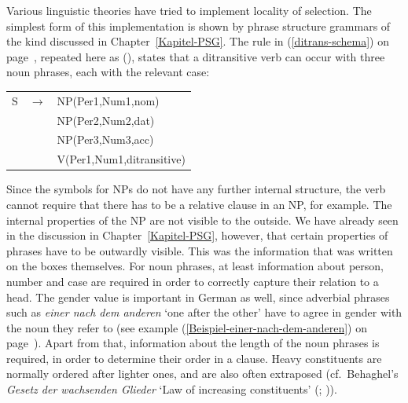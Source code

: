 Various linguistic theories have tried to implement locality of selection. The simplest form of this implementation is shown by
phrase structure grammars of the kind discussed in Chapter~\ref{Kapitel-PSG}. The rule in (\ref{ditrans-schema}) on
page~\pageref{ditrans-schema}, repeated here as (), states that a ditransitive verb can occur with three noun phrases, each
with the relevant case:
\ea
\begin{tabular}[t]{@{}l@{ }l@{ }l}
S  & $\to$ & NP({Per1},{Num1},{nom}) \\
   &       & NP(Per2,Num2,{dat})\\
   &       & NP(Per3,Num3,{acc})\\
   &       & V({Per1},{Num1},ditransitive)\\
\end{tabular}
\z
Since the symbols for NPs do not have any further internal structure, the verb cannot require that there has to be a relative
clause in an NP, for example. The internal properties of the NP are not visible to the outside.
We have already seen in the discussion in Chapter~\ref{Kapitel-PSG}, however, that certain properties of phrases have to be outwardly
visible. This was the information that was written on the boxes themselves. For noun phrases, at least information about
person, number and case are required in order to correctly capture their relation to a head.
The gender value is important in German as well, since adverbial phrases such as \emph{einer nach
  dem anderen} `one after the other' have to agree in gender with the noun they refer to
(see example (\ref{Beispiel-einer-nach-dem-anderen}) on
page~\pageref{Beispiel-einer-nach-dem-anderen}). Apart from that, information about the length of
the noun phrases is required, in order to determine their order in a clause. Heavy constituents are normally ordered after lighter ones, and are also often
extraposed (cf.\ Behaghel's \textit{Gesetz der wachsenden Glieder} `Law of increasing constituents' (\citeyear[]{Behaghel09}; \citeyear[]{Behaghel30})). 

